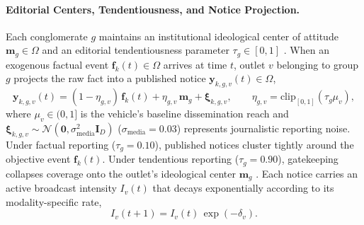 \documentclass{article}
\begin{document}
\paragraph{Editorial Centers, Tendentiousness, and Notice Projection.}
Each conglomerate $g$ maintains an institutional ideological center of attitude $\mathbf{m}_g \in \Omega$ and an editorial tendentiousness parameter $\tau_g \in [0, 1]$ \citep{mullainathan2005market, gentzkow2006media}. When an exogenous factual event $\mathbf{f}_k(t) \in \Omega$ arrives at time $t$, outlet $v$ belonging to group $g$ projects the raw fact into a published notice $\mathbf{y}_{k,g,v}(t) \in \Omega$,
\begin{equation}
    \mathbf{y}_{k,g,v}(t) = (1 - \eta_{g,v})\,\mathbf{f}_k(t) + \eta_{g,v}\,\mathbf{m}_g + \boldsymbol{\xi}_{k,g,v}, \qquad \eta_{g,v} = \mathrm{clip}_{[0, 1]}(\tau_g \mu_v),
    \label{eq:notice_projection_methods}
\end{equation}
where $\mu_v \in (0, 1]$ is the vehicle's baseline dissemination reach and $\boldsymbol{\xi}_{k,g,v} \sim \mathcal{N}(\mathbf{0}, \sigma_{\mathrm{media}}^2 \mathbf{I}_D)$ ($\sigma_{\mathrm{media}} = 0.03$) represents journalistic reporting noise. Under factual reporting ($\tau_g = 0.10$), published notices cluster tightly around the objective event $\mathbf{f}_k(t)$. Under tendentious reporting ($\tau_g = 0.90$), gatekeeping collapses coverage onto the outlet's ideological center $\mathbf{m}_g$ \citep{puglisi2015newspaper}. Each notice carries an active broadcast intensity $I_v(t)$ that decays exponentially according to its modality-specific rate,
\begin{equation}
    I_v(t+1) = I_v(t)\,\exp(-\delta_v).
    \label{eq:media_intensity_decay}
\end{equation}
\end{document}
